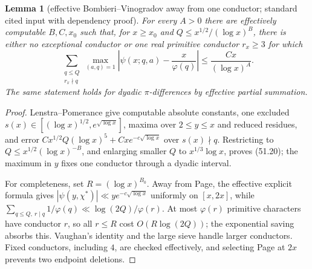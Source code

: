 \documentclass[10pt,reqno]{amsart}
\newtheorem{lemma}[theorem]{Lemma}
\theoremstyle{definition}
\newcommand{\1}{\mathbf 1}
\begin{document}
\begin{lemma}[effective Bombieri--Vinogradov away from one conductor;
standard cited input with dependency proof]\label{lem:effective-BV}
For every $A>0$ there are effectively computable $B,C,x_0$ such that, for
$x\geq x_0$ and $Q\leq x^{1/2}/(\log x)^B$, there is either no exceptional
conductor or one real primitive conductor $r_x\geq3$ for which
\begin{equation}\tag{51.20}
 \sum_{\substack{q\leq Q\\r_x\nmid q}}
 \max_{(a,q)=1}\left|\psi(x;q,a)-\frac{x}{\varphi(q)}\right|
 \leq\frac{Cx}{(\log x)^A}.
\end{equation}
The same statement holds for dyadic $\pi$-differences by effective partial
summation.
\end{lemma}
\begin{proof}
Lenstra--Pomerance \cite[Lemma~11.2, pp.~1258--1260]
{LenstraPomerance} give computable absolute constants, one excluded
$s(x)\in[(\log x)^{1/2},e^{\sqrt{\log x}}]$, maxima over
$2\leq y\leq x$ and reduced residues, and error
$Cx^{1/2}Q(\log x)^5+Cxe^{-c\sqrt{\log x}}$ over $s(x)\nmid q$.
Restricting to $Q\leq x^{1/2}(\log x)^{-B}$, and enlarging smaller $Q$ to
$x^{1/3}\log x$, proves (51.20); the maximum in $y$ fixes one conductor
through a dyadic interval.

For completeness, set $R=(\log x)^{B_0}$.  Away from Page, the effective
explicit formula gives $|\psi(y,\chi^*)|\ll ye^{-c\sqrt{\log x}}$ uniformly
on $[x,2x]$, while
$\sum_{q\leq Q,\ r\mid q}1/\varphi(q)\ll\log(2Q)/\varphi(r)$.
At most $\varphi(r)$ primitive characters have conductor $r$, so all
$r\leq R$ cost $O(R\log(2Q))$; the exponential saving absorbs this.
Vaughan's identity and the large sieve handle larger conductors.  Fixed
conductors, including $4$, are checked effectively, and selecting Page at
$2x$ prevents two endpoint deletions.
\end{proof}
\end{document}
